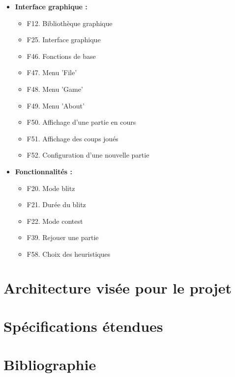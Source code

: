 \documentclass{article}
\begin{document}
\begin{itemize}
    \item \textbf{Interface graphique :}
    \begin{itemize}
        \item F12. Bibliothèque graphique
        \item F25. Interface graphique
        \item F46. Fonctions de base
        \item F47. Menu ’File’
        \item F48. Menu ’Game’
        \item F49. Menu ’About’
        \item F50. Affichage d’une partie en cours
        \item F51. Affichage des coups joués
        \item F52. Configuration d’une nouvelle partie
    \end{itemize}
    \item \textbf{Fonctionnalités :}
    \begin{itemize}
        \item F20. Mode blitz
        \item F21. Durée du blitz
        \item F22. Mode contest
        \item F39. Rejouer une partie
        \item F58. Choix des heuristiques
    \end{itemize}
\end{itemize}

\section{Architecture visée pour le projet}

\section{Spécifications étendues}

\section{Bibliographie}


\end{document}
